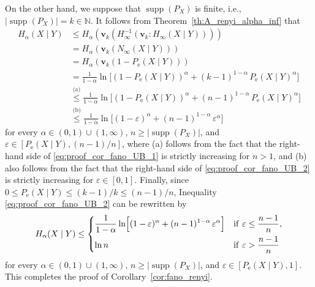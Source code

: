 \documentclass[conference, draftcls, onecolumn]{IEEEtran}
\theoremstyle{plain}
\newcommand{\bvec}[1]{\boldsymbol{#1}}
\newcommand{\supp}{\operatorname{supp}}
\newcommand{\thref}[1]{Theorem~\ref{#1}}
\newcommand{\corref}[1]{Corollary~\ref{#1}}
\begin{document}
\begin{IEEEproof}[Proof of \corref{cor:fano_renyi}]
On the other hand, we suppose that $\supp( P_{X} )$ is finite, i.e., $|\!\supp( P_{X} )| = k \in \mathbb{N}$.
It follows from \thref{th:A_renyi_alpha_inf} that
\begin{align}
H_{\alpha}(X \mid Y)
& \le
H_{\alpha}( \bvec{v}_{k}( H_{\infty}^{-1}( \bvec{v}_{k} : H_{\infty}(X \mid Y) ) ) )
\\
& =
H_{\alpha}( \bvec{v}_{k}( N_{\infty}(X \mid Y) ) )
\\
& =
H_{\alpha}( \bvec{v}_{k}( 1 - P_{\mathrm{e}}(X \mid Y) ) )
\\
& =
\frac{ 1 }{ 1 - \alpha } \ln \! \Big[ (1 - P_{\mathrm{e}}(X \mid Y))^{\alpha} + (k - 1)^{1 - \alpha} \, P_{\mathrm{e}}(X \mid Y)^{\alpha} \Big]
\\
& \overset{\text{(a)}}{\le}
\frac{ 1 }{ 1 - \alpha } \ln \! \Big[ (1 - P_{\mathrm{e}}(X \mid Y))^{\alpha} + (n - 1)^{1 - \alpha} \, P_{\mathrm{e}}(X \mid Y)^{\alpha} \Big]
\label{eq:proof_cor_fano_UB_1} \\
& \overset{\text{(b)}}{\le}
\frac{ 1 }{ 1 - \alpha } \ln \! \Big[ (1 - \varepsilon)^{\alpha} + (n - 1)^{1 - \alpha} \, \varepsilon^{\alpha} \Big]
\label{eq:proof_cor_fano_UB_2}
\end{align}
for every $\alpha \in (0, 1) \cup (1, \infty)$, $n \ge |\!\supp( P_{X} ) |$, and $\varepsilon \in [P_{\mathrm{e}}(X \mid Y), (n-1)/n]$, where (a) follows from the fact that the right-hand side of \eqref{eq:proof_cor_fano_UB_1} is strictly increasing for $n > 1$, and (b) also follows from the fact that the right-hand side of \eqref{eq:proof_cor_fano_UB_2} is strictly increasing for $\varepsilon \in [0, 1]$.
Finally, since $0 \le P_{\mathrm{e}}(X \mid Y) \le (k - 1)/ k \le (n - 1)/n$, Inequality \eqref{eq:proof_cor_fano_UB_2} can be rewritten by
\begin{align}
H_{\alpha}(X \mid Y)
\le
\begin{dcases}
\frac{ 1 }{ 1 - \alpha } \ln \! \Big[ (1 - \varepsilon)^{\alpha} + (n - 1)^{1 - \alpha} \, \varepsilon^{\alpha} \Big]
& \mathrm{if} \ \varepsilon \le \frac{ n - 1 }{ n } ,
\\
\ln n
& \mathrm{if} \ \varepsilon > \frac{ n - 1 }{ n }
\end{dcases}
\end{align}
for every $\alpha \in (0, 1) \cup (1, \infty)$, $n \ge |\!\supp( P_{X} ) |$, and $\varepsilon \in [P_{\mathrm{e}}(X \mid Y), 1]$.
This completes the proof of \corref{cor:fano_renyi}.
\end{IEEEproof}
\end{document}
